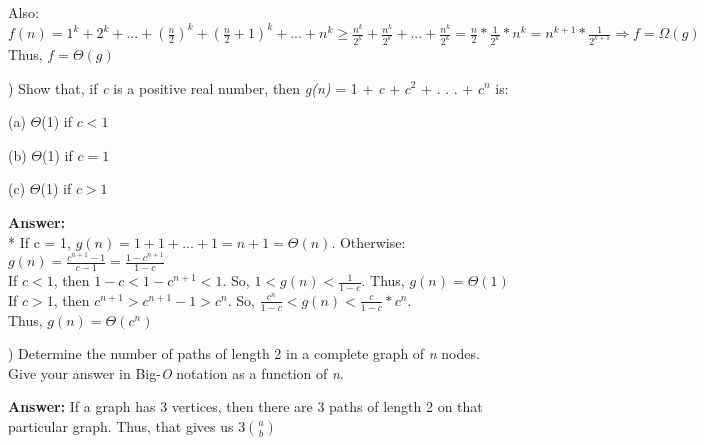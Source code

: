 \documentclass{article}
\begin{document}
\vspace{0.1in}
Also: \\
$f(n) = 1^k + 2^k + . . . + (\frac{n}{2})^k + (\frac{n}{2} + 1)^ k + . . . + n^k \ge \frac{n^k}{2^k} + \frac{n^k}{2^k} + . . . + \frac{n^k}{2^k} = \frac{n}{2} * \frac{1}{2^k} * n^k = n^{k + 1} * \frac{1}{2^{k + 1}} \Rightarrow f = \Omega(g)$ \\

\vspace{0.1in}
Thus, $f = \Theta(g)$


\vspace{.5in}
) Show that, if \textit{c} is a positive real number, then \textit{g(n)} = 1 + \textit{c} + $c^2$ + . . . + 
\indent$c^n$ is:

\vspace{.1in}
\indent (a) $\Theta$(1) if $c < 1$

\indent (b) $\Theta$(1) if $c = 1$

\indent (c) $\Theta$(1) if $c > 1$

\vspace{.1in}
{\bf Answer:}
\\*
\indent If c = 1, $g(n) = 1 + 1 + . . .  + 1 = n + 1 = \Theta(n)$. Otherwise: \\

\indent \indent \indent $g(n) = \frac{c^{n + 1} - 1}{c - 1} = \frac{1 - c^{n + 1}}{1 - c}$ \\

\indent If $c < 1$, then $1 - c < 1 - c^{n + 1} < 1$. So, $1 < g(n) < \frac{1}{1 - c}$. Thus, $g(n) = \Theta(1)$ \\

\indent If $c > 1$, then $c^{n + 1} > c^{n + 1} - 1 > c^n$. So, $\frac{c^n}{1 - c} < g(n) < \frac{c}{1 - c} * c^n$. \\
\indent Thus, $g(n) = \Theta(c^n)$

\vspace{.5in}
) Determine the number of paths of length 2 in a complete graph of \textit{n} nodes.
\indent Give your answer in Big-\textit{O} notation as a function of \textit{n}.

\vspace{.1in}
{\bf Answer:} If a graph has 3 vertices, then there are 3 paths of length 2 on that particular graph. Thus, that gives us 3$a \choose b$
\end{document}

